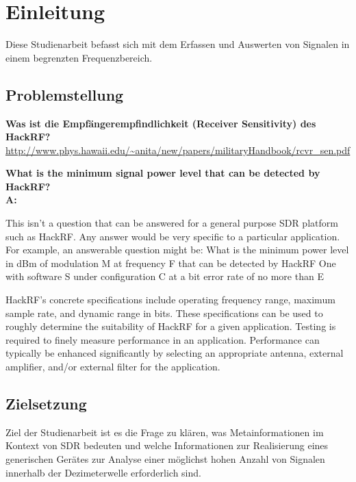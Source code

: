 
\chapter{Einleitung}
Diese Studienarbeit befasst sich mit dem Erfassen und Auswerten von Signalen in einem begrenzten Frequenzbereich.  

\section{Problemstellung}


\textbf{Was ist die Empfängerempfindlichkeit (Receiver Sensitivity) des HackRF?}\\
\url{http://www.phys.hawaii.edu/~anita/new/papers/militaryHandbook/rcvr_sen.pdf}


\textbf{What is the minimum signal power level that can be detected by HackRF?\\
A:}

This isn't a question that can be answered for a general purpose SDR platform such as HackRF. Any answer would be very specific to a particular application. For example, an answerable question might be: What is the minimum power level in dBm of modulation M at frequency F that can be detected by HackRF One with software S under configuration C at a bit error rate of no more than E%

HackRF's concrete specifications include operating frequency range, maximum sample rate, and dynamic range in bits. These specifications can be used to roughly determine the suitability of HackRF for a given application. Testing is required to finely measure performance in an application. Performance can typically be enhanced significantly by selecting an appropriate antenna, external amplifier, and/or external filter for the application.

\section{Zielsetzung}
Ziel der Studienarbeit ist es die Frage zu klären, was Metainformationen im Kontext von \ac{SDR} bedeuten und welche Informationen zur Realisierung eines generischen Gerätes zur Analyse einer möglichst hohen Anzahl von Signalen innerhalb der Dezimeterwelle erforderlich sind.\\

